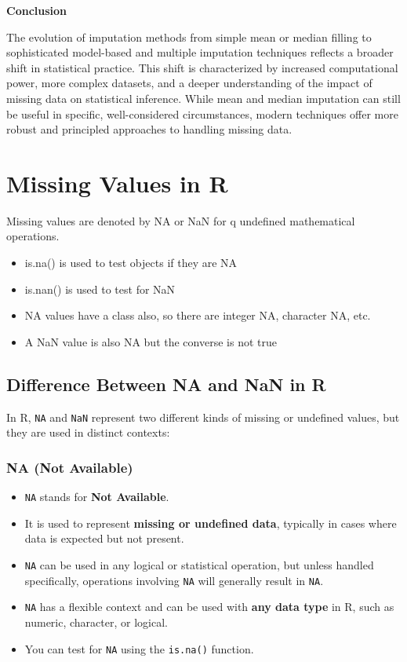 \documentclass[
]{book}
\providecommand{\tightlist}{%
  \setlength{\itemsep}{0pt}\setlength{\parskip}{0pt}}
\begin{document}
\textbf{Conclusion}

The evolution of imputation methods from simple mean or median filling
to sophisticated model-based and multiple imputation techniques reflects
a broader shift in statistical practice. This shift is characterized by
increased computational power, more complex datasets, and a deeper
understanding of the impact of missing data on statistical inference.
While mean and median imputation can still be useful in specific,
well-considered circumstances, modern techniques offer more robust and
principled approaches to handling missing data.

\section*{Missing Values in R}\label{missing-values-in-r}

Missing values are denoted by NA or NaN for q undefined mathematical
operations.

\begin{itemize}
\tightlist
\item
  is.na() is used to test objects if they are NA
\item
  is.nan() is used to test for NaN
\item
  NA values have a class also, so there are integer NA, character NA,
  etc.
\item
  A NaN value is also NA but the converse is not true
\end{itemize}

\subsection{Difference Between NA and NaN in R}\label{difference-between-na-and-nan-in-r}

In R, \texttt{NA} and \texttt{NaN} represent two different kinds of missing or
undefined values, but they are used in distinct contexts:

\subsubsection{NA (Not Available)}\label{na-not-available}

\begin{itemize}
\tightlist
\item
  \texttt{NA} stands for \textbf{Not Available}.
\item
  It is used to represent \textbf{missing or undefined data}, typically in
  cases where data is expected but not present.
\item
  \texttt{NA} can be used in any logical or statistical operation, but unless
  handled specifically, operations involving \texttt{NA} will generally
  result in \texttt{NA}.
\item
  \texttt{NA} has a flexible context and can be used with \textbf{any data type}
  in R, such as numeric, character, or logical.
\item
  You can test for \texttt{NA} using the \texttt{is.na()} function.
\end{itemize}
\end{document}
